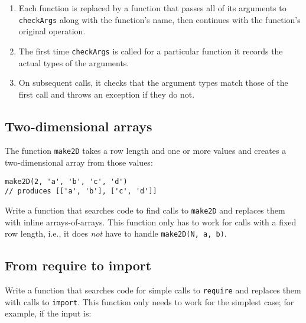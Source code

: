 \documentclass[krantzl]{krantz}
\begin{document}
\begin{enumerate}

\item 

Each function is replaced by a function that passes all of its arguments to \texttt{checkArgs}
    along with the function's name,
    then continues with the function's original operation.



\item 

The first time \texttt{checkArgs} is called for a particular function
    it records the actual types of the arguments.



\item 

On subsequent calls, it checks that the argument types match those of the first call
    and throws an exception if they do not.



\end{enumerate}

\subsection*{Two-dimensional arrays}


The function \texttt{make2D} takes a row length and one or more values
and creates a two-dimensional array from those values:

\begin{lstlisting}[frame=single,frameround=tttt]
make2D(2, 'a', 'b', 'c', 'd')
// produces [['a', 'b'], ['c', 'd']]
\end{lstlisting}


\noindent Write a function that searches code to find calls to \texttt{make2D}
and replaces them with inline arrays-of-arrays.
This function only has to work for calls with a fixed row length,
i.e., it does \emph{not} have to handle \texttt{make2D(N, {\textquotesingle}a{\textquotesingle}, {\textquotesingle}b{\textquotesingle})}.

\subsection*{From require to import}


Write a function that searches code for simple calls to \texttt{require}
and replaces them with calls to \texttt{import}.
This function only needs to work for the simplest case;
for example, if the input is:
\end{document}

